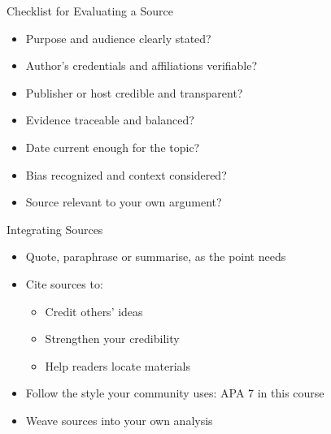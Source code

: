 \documentclass[aspectratio=169]{beamer}
\begin{document}
\begin{frame}{Checklist for Evaluating a Source}
\begin{itemize}
  \item Purpose and audience clearly stated?
  \item Author’s credentials and affiliations verifiable?
  \item Publisher or host credible and transparent?
  \item Evidence traceable and balanced?
  \item Date current enough for the topic?
  \item Bias recognized and context considered?
  \item Source relevant to your own argument?
\end{itemize}
\end{frame}

\begin{frame}{Integrating Sources}
\begin{itemize}
  \item Quote, paraphrase or summarise, as the point needs
  \item Cite sources to:
    \begin{itemize}
      \item Credit others’ ideas
      \item Strengthen your credibility
      \item Help readers locate materials
    \end{itemize}
  \item Follow the style your community uses: APA 7 in this course
  \item Weave sources into your own analysis
\end{itemize}
\end{frame}
\end{document}
